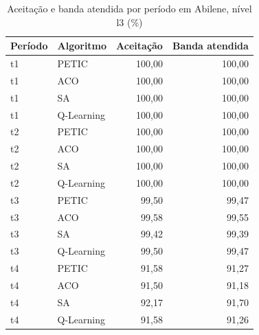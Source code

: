 \begin{table}[htb]
    \centering
    \scriptsize
    \caption{Aceitação e banda atendida por período em Abilene, nível l3 (\%)}
    \label{tab:periodos-abilene-l3}
    \begin{tabular}{llrr}
        \hline
        Período & Algoritmo & Aceitação & Banda atendida \\
        \hline
        t1 & PETIC & 100,00 & 100,00 \\
        t1 & ACO & 100,00 & 100,00 \\
        t1 & SA & 100,00 & 100,00 \\
        t1 & Q-Learning & 100,00 & 100,00 \\
        t2 & PETIC & 100,00 & 100,00 \\
        t2 & ACO & 100,00 & 100,00 \\
        t2 & SA & 100,00 & 100,00 \\
        t2 & Q-Learning & 100,00 & 100,00 \\
        t3 & PETIC & 99,50 & 99,47 \\
        t3 & ACO & 99,58 & 99,55 \\
        t3 & SA & 99,42 & 99,39 \\
        t3 & Q-Learning & 99,50 & 99,47 \\
        t4 & PETIC & 91,58 & 91,27 \\
        t4 & ACO & 91,50 & 91,18 \\
        t4 & SA & 92,17 & 91,70 \\
        t4 & Q-Learning & 91,58 & 91,26 \\
        \hline
    \end{tabular}
\end{table}

